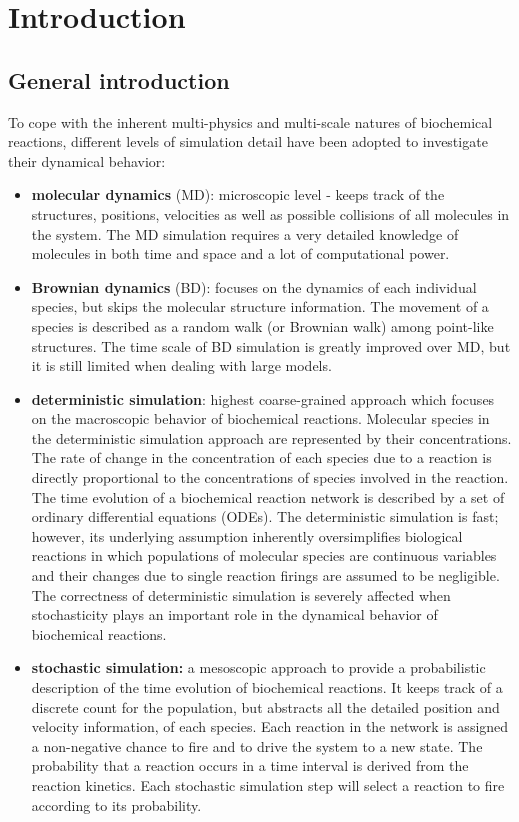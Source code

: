 \graphicspath{{chapters/01/images/}}
\chapter{Introduction}

\section{General introduction}
To cope with the inherent multi-physics and multi-scale natures of biochemical reactions, different levels of simulation detail have been adopted to investigate their dynamical behavior:

\begin{itemize}
  \item \textbf{molecular dynamics} (MD): microscopic level - keeps track of the structures, positions, velocities as well as possible collisions of all molecules in the system.
     The MD simulation requires a very detailed knowledge of molecules in both time and space and a lot of computational power.
  \item \textbf{Brownian dynamics} (BD): focuses on the dynamics of each individual species, but skips the molecular structure information.
     The movement of a species is described as a random walk (or Brownian walk) among point-like structures.
     The time scale of BD simulation is greatly improved over MD, but it is still limited when dealing with large models.
  \item \textbf{deterministic simulation}: highest coarse-grained approach which focuses on the macroscopic behavior of biochemical reactions.
    Molecular species in the deterministic simulation approach are represented by their concentrations.
    The rate of change in the concentration of each species due to a reaction is directly proportional to the concentrations of species involved in the reaction.
    The time evolution of a biochemical reaction network is described by a set of ordinary differential equations (ODEs).
    The deterministic simulation is fast; however, its underlying assumption inherently oversimplifies biological reactions in which populations of molecular species are continuous variables and their changes due to single reaction firings are assumed to be negligible.
    The correctness of deterministic simulation is severely affected when stochasticity plays an important role in the dynamical behavior of biochemical reactions.
  \item \textbf{stochastic simulation:} a mesoscopic approach to provide a probabilistic description of the time evolution of biochemical reactions.
    It keeps track of a discrete count for the population, but abstracts all the detailed position and velocity information, of each species.
    Each reaction in the network is assigned a non-negative chance to fire and to drive the system to a new state.
    The probability that a reaction occurs in a time interval is derived from the reaction kinetics.
    Each stochastic simulation step will select a reaction to fire according to its probability.
\end{itemize}

